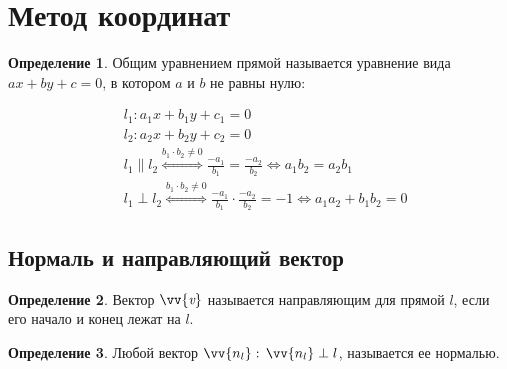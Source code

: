 \documentclass[12pt]{article}
\theoremstyle{definition}
\newtheorem{definition}{Определение}
\begin{document}
    \section{Метод координат}

    \begin{definition}
        Общим уравнением прямой называется уравнение вида $ax+by+c=0$, в котором $a$ и $b$ не равны нулю:

        \begin{align*}
            &l_1:a_1x+b_1y+c_1=0\\
            &l_2:a_2x+b_2y+c_2=0\\
            &l_1\parallel l_2 \overset{b_1\cdot b_2\neq 0}{\Longleftrightarrow} \frac{-a_1}{b_1}=\frac{-a_2}{b_2}\Longleftrightarrow a_1b_2=a_2b_1\\
            &l_1\perp l_2 \overset{b_1\cdot b_2\neq 0}{\Longleftrightarrow} \frac{-a_1}{b_1}\cdot \frac{-a_2}{b_2}=-1 \Longleftrightarrow a_1a_2+b_1b_2=0
        \end{align*}
    \end{definition}

    \subsection{Нормаль и направляющий вектор}

    \begin{definition}
        Вектор $\vv{\textit{v}}$ называется направляющим для прямой $l$, если его начало и конец лежат на $l$.
    \end{definition}

    \begin{definition}
        Любой вектор $\vv{n_l}:\, \vv{n_l}\perp l$, называется ее нормалью.
    \end{definition}
\end{document}
